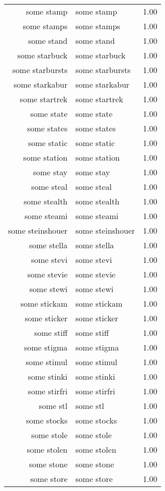 \begin{table}[ht]
\begin{tabular}{rlr}
  some stamp & some stamp & 1.00 \\ 
  some stamps & some stamps & 1.00 \\ 
  some stand & some stand & 1.00 \\ 
  some starbuck & some starbuck & 1.00 \\ 
  some starbursts & some starbursts & 1.00 \\ 
  some starkabur & some starkabur & 1.00 \\ 
  some startrek & some startrek & 1.00 \\ 
  some state & some state & 1.00 \\ 
  some states & some states & 1.00 \\ 
  some static & some static & 1.00 \\ 
  some station & some station & 1.00 \\ 
  some stay & some stay & 1.00 \\ 
  some steal & some steal & 1.00 \\ 
  some stealth & some stealth & 1.00 \\ 
  some steami & some steami & 1.00 \\ 
  some steinshouer & some steinshouer & 1.00 \\ 
  some stella & some stella & 1.00 \\ 
  some stevi & some stevi & 1.00 \\ 
  some stevie & some stevie & 1.00 \\ 
  some stewi & some stewi & 1.00 \\ 
  some stickam & some stickam & 1.00 \\ 
  some sticker & some sticker & 1.00 \\ 
  some stiff & some stiff & 1.00 \\ 
  some stigma & some stigma & 1.00 \\ 
  some stimul & some stimul & 1.00 \\ 
  some stinki & some stinki & 1.00 \\ 
  some stirfri & some stirfri & 1.00 \\ 
  some stl & some stl & 1.00 \\ 
  some stocks & some stocks & 1.00 \\ 
  some stole & some stole & 1.00 \\ 
  some stolen & some stolen & 1.00 \\ 
  some stone & some stone & 1.00 \\ 
  some store & some store & 1.00 \\ 

\end{tabular}
\end{table}
